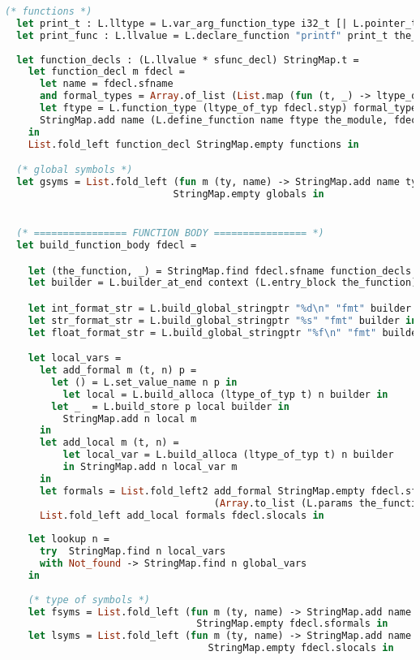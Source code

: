 \begin{lstlisting}[language=Caml,backgroundcolor=\color{backgroundcolor}]
  (* functions *)
  let print_t : L.lltype = L.var_arg_function_type i32_t [| L.pointer_type i8_t |] in
  let print_func : L.llvalue = L.declare_function "printf" print_t the_module in
  
  let function_decls : (L.llvalue * sfunc_decl) StringMap.t =
    let function_decl m fdecl =
      let name = fdecl.sfname
      and formal_types = Array.of_list (List.map (fun (t, _) -> ltype_of_typ t) fdecl.sformals) in
      let ftype = L.function_type (ltype_of_typ fdecl.styp) formal_types in
      StringMap.add name (L.define_function name ftype the_module, fdecl) m
    in
    List.fold_left function_decl StringMap.empty functions in

  (* global symbols *)
  let gsyms = List.fold_left (fun m (ty, name) -> StringMap.add name ty m)
                             StringMap.empty globals in


  (* ================ FUNCTION BODY ================ *)
  let build_function_body fdecl =

    let (the_function, _) = StringMap.find fdecl.sfname function_decls in
    let builder = L.builder_at_end context (L.entry_block the_function) in

    let int_format_str = L.build_global_stringptr "%d\n" "fmt" builder in
    let str_format_str = L.build_global_stringptr "%s" "fmt" builder in 
    let float_format_str = L.build_global_stringptr "%f\n" "fmt" builder in

    let local_vars =
      let add_formal m (t, n) p = 
        let () = L.set_value_name n p in
	      let local = L.build_alloca (ltype_of_typ t) n builder in
        let _  = L.build_store p local builder in
	      StringMap.add n local m
      in
      let add_local m (t, n) =
	      let local_var = L.build_alloca (ltype_of_typ t) n builder
	      in StringMap.add n local_var m 
      in
      let formals = List.fold_left2 add_formal StringMap.empty fdecl.sformals
                                    (Array.to_list (L.params the_function)) in
      List.fold_left add_local formals fdecl.slocals in
    
    let lookup n =
      try  StringMap.find n local_vars
      with Not_found -> StringMap.find n global_vars
    in
    
    (* type of symbols *)
    let fsyms = List.fold_left (fun m (ty, name) -> StringMap.add name ty m)
                                 StringMap.empty fdecl.sformals in
    let lsyms = List.fold_left (fun m (ty, name) -> StringMap.add name ty m)
	                               StringMap.empty fdecl.slocals in


\end{lstlisting}
